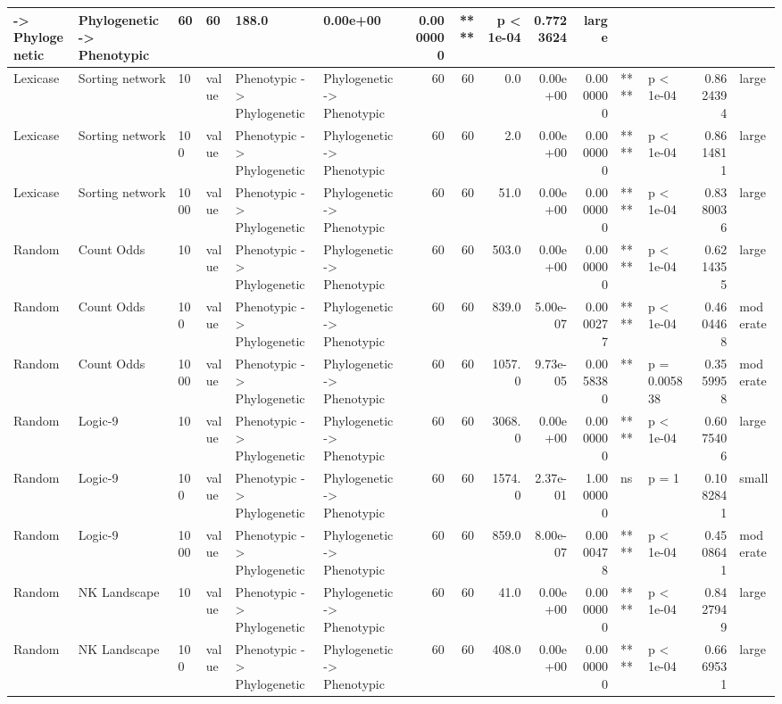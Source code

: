 \documentclass[]{book}
\begin{document}
\begin{table}
\begin{tabular}[t]{l|l|l|l|l|l|r|r|r|r|r|l|l|r|l}
    ->
Phylogenetic & Phylogenetic
    ->
Phenotypic & 60 & 60 & 188.0 & 0.00e+00 & 0.0000000 & **** & p < 1e-04 & 0.7723624 & large\\
\hline
Lexicase & Sorting network & 10 & value & Phenotypic
    ->
Phylogenetic & Phylogenetic
    ->
Phenotypic & 60 & 60 & 0.0 & 0.00e+00 & 0.0000000 & **** & p < 1e-04 & 0.8624394 & large\\
\hline
Lexicase & Sorting network & 100 & value & Phenotypic
    ->
Phylogenetic & Phylogenetic
    ->
Phenotypic & 60 & 60 & 2.0 & 0.00e+00 & 0.0000000 & **** & p < 1e-04 & 0.8614811 & large\\
\hline
Lexicase & Sorting network & 1000 & value & Phenotypic
    ->
Phylogenetic & Phylogenetic
    ->
Phenotypic & 60 & 60 & 51.0 & 0.00e+00 & 0.0000000 & **** & p < 1e-04 & 0.8380036 & large\\
\hline
Random & Count Odds & 10 & value & Phenotypic
    ->
Phylogenetic & Phylogenetic
    ->
Phenotypic & 60 & 60 & 503.0 & 0.00e+00 & 0.0000000 & **** & p < 1e-04 & 0.6214355 & large\\
\hline
Random & Count Odds & 100 & value & Phenotypic
    ->
Phylogenetic & Phylogenetic
    ->
Phenotypic & 60 & 60 & 839.0 & 5.00e-07 & 0.0000277 & **** & p < 1e-04 & 0.4604468 & moderate\\
\hline
Random & Count Odds & 1000 & value & Phenotypic
    ->
Phylogenetic & Phylogenetic
    ->
Phenotypic & 60 & 60 & 1057.0 & 9.73e-05 & 0.0058380 & ** & p = 0.005838 & 0.3559958 & moderate\\
\hline
Random & Logic-9 & 10 & value & Phenotypic
    ->
Phylogenetic & Phylogenetic
    ->
Phenotypic & 60 & 60 & 3068.0 & 0.00e+00 & 0.0000000 & **** & p < 1e-04 & 0.6075406 & large\\
\hline
Random & Logic-9 & 100 & value & Phenotypic
    ->
Phylogenetic & Phylogenetic
    ->
Phenotypic & 60 & 60 & 1574.0 & 2.37e-01 & 1.0000000 & ns & p = 1 & 0.1082841 & small\\
\hline
Random & Logic-9 & 1000 & value & Phenotypic
    ->
Phylogenetic & Phylogenetic
    ->
Phenotypic & 60 & 60 & 859.0 & 8.00e-07 & 0.0000478 & **** & p < 1e-04 & 0.4508641 & moderate\\
\hline
Random & NK Landscape & 10 & value & Phenotypic
    ->
Phylogenetic & Phylogenetic
    ->
Phenotypic & 60 & 60 & 41.0 & 0.00e+00 & 0.0000000 & **** & p < 1e-04 & 0.8427949 & large\\
\hline
Random & NK Landscape & 100 & value & Phenotypic
    ->
Phylogenetic & Phylogenetic
    ->
Phenotypic & 60 & 60 & 408.0 & 0.00e+00 & 0.0000000 & **** & p < 1e-04 & 0.6669531 & large\\

\end{tabular}
\end{table}
\end{document}
